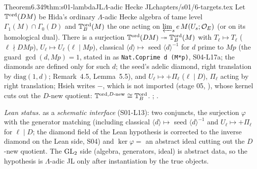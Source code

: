 \begin{quoted}{Theorem}{6.3}{49}{thm:s01-lambdaJL}{$\Lambda$-adic Hecke JL}{chapters/s01/6-targets.tex}\label{rpt:thm:s01-lambdaJL}
Let $\mathbb{T}^{\mathrm{ord}}(DM)$ be Hida's ordinary $\Lambda$-adic Hecke algebra of tame level $\Gamma_1(M)\cap\Gamma_0(D)$ and
$\mathbb{T}^{\mathrm{ord}}_B(M)$ the one acting on $\varprojlim_se\,M(U_s;\mathcal{O}_E)$ (or on its homological dual). There is a surjection
$\mathbb{T}^{\mathrm{ord}}(DM)\twoheadrightarrow\mathbb{T}^{\mathrm{ord}}_B(M)$ with $T_\ell\mapsto T_\ell$ ($\ell\nmid DMp$), $U_\ell\mapsto U_\ell$ ($\ell\mid Mp$),
classical $\langle d\rangle\mapsto$ seed $\langle d\rangle^{-1}$ for $d$ prime to $Mp$ (the guard $\gcd(d,Mp)=1$, stated in  as \texttt{Nat.Coprime d (M*p)}, S04-L17a; the diamonds are defined only for such $d$; the seed's adelic diamond, right translation by $\mathrm{diag}(1,d)$; Remark~4.5, Lemma~5.5), and $U_\ell\mapsto+\Pi_\ell$ ($\ell\mid D$), $\Pi_\ell$ acting by right translation; Hsieh writes $-$, which is not imported (stage 05, ),
whose kernel cuts out the
$D$-new quotient: $\mathbb{T}^{\mathrm{ord},D\text{-new}}\cong\mathbb{T}^{\mathrm{ord}}_B$.
\stcited{} \cite[Prop.~6.1,
p.~27 (iso of $\tilde\Lambda$-algebras $\T^{\ord}_\infty\simeq\mathbb B^{\ord}_\infty$, with $T(n,n)=\langle n\rangle$ normalised as in
their {[25]})]{LV}; \cite[\S4.5, p.~34 (surjection
$\mathrm{JL}:\T(N,\mathbb I)\to\T^D(N,\mathbb I)$, with his sign $\mathrm{JL}(U_q)=-U_q$ for $q\mid N^-$, not imported)]{Hs}.
\par\smallskip{}\par
\noindent\emph{Lean status.}  \stformal{} as a \emph{schematic interface} (S01-L13): two conjuncts, the surjection
$\varphi$ with the generator matching (including classical $\langle d\rangle\mapsto$ seed $\langle d\rangle^{-1}$ and $U_\ell\mapsto+\Pi_\ell$ for $\ell\mid D$; the diamond field of the Lean hypothesis is corrected to the inverse diamond on the Lean side, S04) and $\ker\varphi=$ an abstract ideal cutting out the $D$-new
quotient. The $\mathrm{GL}_2$ side (algebra, generators, ideal) is abstract data, so the hypothesis is $\Lambda$-adic JL only after instantiation by the true objects.
\end{quoted}
